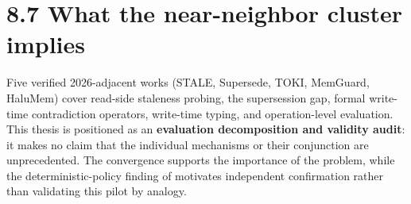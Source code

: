 \section{8.7 What the near-neighbor cluster
implies}\label{what-the-near-neighbor-cluster-implies}

Five verified 2026-adjacent works (STALE, Supersede, TOKI, MemGuard,
HaluMem) cover read-side staleness probing, the supersession gap, formal
write-time contradiction operators, write-time typing, and
operation-level evaluation. This thesis is positioned as an
\textbf{evaluation decomposition and validity audit}: it makes no claim
that the individual mechanisms or their conjunction are unprecedented.
The convergence supports the importance of the problem, while the
deterministic-policy finding of \citep{reddy2026freshness} motivates
independent confirmation rather than validating this pilot by analogy.
